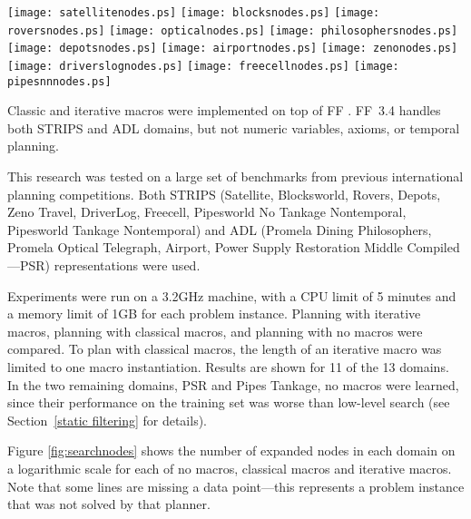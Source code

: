 \documentclass{article}
\begin{document}
\begin{figure*}
\begin{center}
\texttt{[image: satellitenodes.ps]}
\texttt{[image: blocksnodes.ps]}
\texttt{[image: roversnodes.ps]}
\texttt{[image: opticalnodes.ps]}
\texttt{[image: philosophersnodes.ps]}
\texttt{[image: depotsnodes.ps]} 
\texttt{[image: airportnodes.ps]} 
\texttt{[image: zenonodes.ps]}
\texttt{[image: driverslognodes.ps]} 
\texttt{[image: freecellnodes.ps]}
\texttt{[image: pipesnnnodes.ps]}
\caption{Search effort as expanded nodes.
Problem sets are ordered so that the ``No Macros'' curve
is monotonically increasing.}
\label{fig:searchnodes}
\end{center}
\end{figure*}

Classic and iterative macros were implemented on top of {\sc FF} \cite{Hoffmann:01a}.
{\sc FF~3.4} handles both STRIPS and ADL domains,
but not numeric variables, axioms, or temporal planning.

This research was tested on a large set of benchmarks from
previous international planning competitions.
Both STRIPS (Satellite, Blocksworld, Rovers, Depots, Zeno Travel, DriverLog,
Freecell,  Pipesworld No Tankage Nontemporal,
Pipesworld Tankage Nontemporal)
and ADL (Promela Dining Philosophers, Promela Optical Telegraph,
Airport, Power Supply Restoration Middle Compiled---PSR)
representations were used.

Experiments were run on a 3.2GHz machine,
with a CPU limit of 5 minutes and a memory limit of 1GB for each problem instance.
Planning with iterative macros, planning with classical macros,
and planning with no macros were compared.
To plan with classical macros,
the length of an iterative macro was limited to one macro instantiation.
Results are shown for 11 of the 13 domains. 
In the two remaining domains, PSR and Pipes Tankage, no macros were learned,
since their performance on the training set was worse than low-level search
(see Section~\ref{static filtering} for details).

Figure \ref{fig:searchnodes} shows the number of expanded nodes in each domain
on a logarithmic scale for each of no macros, classical macros and iterative macros.
Note that some lines are missing a data point---this represents a problem instance
that was not solved by that planner.
\end{document}
